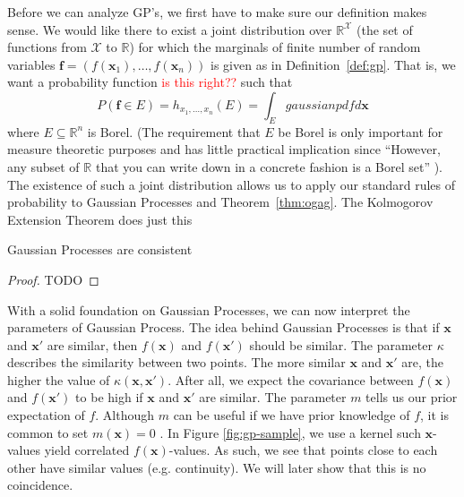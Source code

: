 Before we can analyze GP's, we first have to make sure our definition makes sense.
We would like there to exist a joint distribution over $\mathbb{R}^{\mathcal{X}}$ (the set of functions from $\mathcal{X}$ to $\mathbb{R}$)
for which the marginals of finite number of random variables $\mathbf{f} = (f(\mathbf{x}_1), \ldots, f(\mathbf{x}_n))$ 
is given as in Definition~\ref{def:gp}.
That is, we want a probability function \textcolor{red}{is this right??} such that
\begin{equation*}
    P(\mathbf{f} \in E) = h_{x_1, \ldots, x_n}(E) = \int_{E} gaussian pdf d \mathbf{x}
\end{equation*}
where $E \subseteq \mathbb{R}^{n}$ is Borel.
(The requirement that $E$ be Borel is only important for measure theoretic purposes and has little practical implication since ``However, any subset of $\mathbb{R}$ that you can write down in a concrete fashion is a Borel set'' \cite{axler2020}).
The existence of such a joint distribution allows us to apply our standard rules of probability to Gaussian Processes and Theorem~\ref{thm:ogag}.
The Kolmogorov Extension Theorem does just this

\begin{theorem}\label{thm:kol-ext}
    
\end{theorem}

\begin{theorem}\label{thm:gp-const}
    Gaussian Processes are consistent
\end{theorem}
\begin{proof}
    TODO
\end{proof}


With a solid foundation on Gaussian Processes, we can now interpret the parameters of Gaussian Process.
The idea behind Gaussian Processes is that if $\mathbf{x}$ and $\mathbf{x}'$ are similar, then
$f(\mathbf{x})$ and $f(\mathbf{x}')$ should be similar.
The parameter $\kappa$ describes the similarity between two points.
The more similar $\mathbf{x}$ and $\mathbf{x}'$ are, the higher the value of $\kappa(\mathbf{x}, \mathbf{x}')$.
After all, we expect the covariance between $f(\mathbf{x})$ and $f(\mathbf{x}')$
to be high if $\mathbf{x}$ and $\mathbf{x}'$ are similar.
The parameter $m$ tells us our prior expectation of $f$.
Although $m$ can be useful if we have prior knowledge of $f$, it is common to set $m(\mathbf{x}) = 0$ \cite{murphy2012}.
In Figure \ref{fig:gp-sample}, we use a kernel such $\mathbf{x}$-values yield correlated $f(\mathbf{x})$-values.
As such, we see that points close to each other have similar values (e.g. continuity).
We will later show that this is no coincidence.

